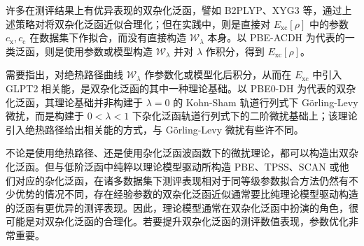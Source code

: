 许多在测评结果上有优异表现的双杂化泛函，譬如 B2PLYP、XYG3 等，通过上述策略对将双杂化泛函近似合理化\cite{Grimme-Grimme.JCP.2006, Zhang-Goddard.PNAS.2009}；但在实践中，则是直接对 $E_\mathrm{xc} [\rho]$ 中的参数 $c_\mathrm{x}, c_\mathrm{c}$ 在数据集下作拟合，而没有直接构造 $\mathcal{W}_{\lambda}$ 本身。以 PBE-ACDH\cite{Su-Xu.JCP.2014} 为代表的一类泛函，则是使用参数或模型构造 $\mathcal{W}_{\lambda}$ 并对 $\lambda$ 作积分，得到 $E_\mathrm{xc} [\rho]$。

需要指出，对绝热路径曲线 $\mathcal{W}_{\lambda}$ 作参数化或模型化后积分，从而在 $E_\mathrm{xc}$ 中引入 GLPT2 相关能，是双杂化泛函的其中一种理论基础。以 PBE0-DH\cite{Toulouse-Adamo.JCP.2011} 为代表的双杂化泛函，其理论基础并非构建于 $\lambda = 0$ 的 Kohn-Sham 轨道行列式下 G\"orling-Levy 微扰，而是构建于 $0 < \lambda < 1$ 下杂化泛函轨道行列式下的二阶微扰基础上\cite{Sharkas-Savin.JCP.2011}；该理论引入绝热路径给出相关能的方式，与 G\"orling-Levy 微扰有些许不同。

不论是使用绝热路径、还是使用杂化泛函波函数下的微扰理论，都可以构造出双杂化泛函。但与低阶泛函中纯粹以理论模型驱动所构造 PBE、TPSS、SCAN 或他们对应的杂化泛函，在诸多数据集下测评表现相对于同等级参数拟合方法仍然有不少优势\cite{Goerigk-Grimme.PCCP.2017, Medvedev-Lyssenko.S.2017}的情况不同，存在经验参数的双杂化泛函近似通常要比纯理论模型驱动构造的泛函有更优异的测评表现\cite{Mehta-Goerigk.PCCP.2018}。因此，理论模型通常在双杂化泛函中扮演的角色，很可能是对双杂化泛函的合理化。若要提升双杂化泛函的测评数值表现，参数优化非常重要。

